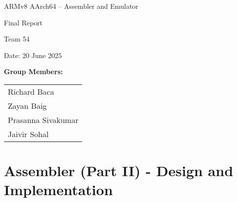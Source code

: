 \documentclass[11pt]{article}
\begin{document}
\begin{titlepage}
    \centering
    \vspace*{2cm}
    
    {\huge ARMv8 AArch64 – Assembler and Emulator\par}
    
    \vspace{1.5cm}
    
    {\LARGE Final Report\par}
    
    \vspace{0.5cm}
    
    
    \vfill %
    
    {\Large Team 54\par}
    
    \vspace{1cm}
    
    {\large Date: 20 June 2025\par}
    
    \vspace{1cm}
    
    \textbf{Group Members:}\\
    \begin{large}
        \begin{tabular}{l}
            Richard Baca\\
            Zayan Baig\\
            Prasanna Sivakumar\\
            Jaivir Sohal\\
        \end{tabular}
    \end{large}

    \vspace*{2cm}
    
\end{titlepage}

\section{Assembler (Part II) - Design and Implementation}
\end{document}
